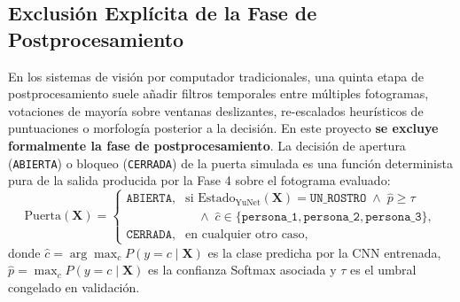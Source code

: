 \documentclass{article}
\begin{document}
\subsection{Exclusión Explícita de la Fase de Postprocesamiento}
En los sistemas de visión por computador tradicionales, una quinta etapa de postprocesamiento suele añadir filtros temporales entre múltiples fotogramas, votaciones de mayoría sobre ventanas deslizantes, re-escalados heurísticos de puntuaciones o morfología posterior a la decisión. En este proyecto \textbf{se excluye formalmente la fase de postprocesamiento}. La decisión de apertura (\texttt{ABIERTA}) o bloqueo (\texttt{CERRADA}) de la puerta simulada es una función determinista pura de la salida producida por la Fase 4 sobre el fotograma evaluado:
\begin{equation}
\text{Puerta}(\mathbf{X}) = \begin{cases}
\texttt{ABIERTA}, & \text{si } \text{Estado}_{\text{YuNet}}(\mathbf{X}) = \texttt{UN\_ROSTRO} \;\wedge\; \hat{p} \ge \tau \\
 & \quad \wedge\; \hat{c} \in \{\texttt{persona\_1}, \texttt{persona\_2}, \texttt{persona\_3}\}, \\
\texttt{CERRADA}, & \text{en cualquier otro caso},
\end{cases}
\label{eq:regla_acceso_determinista}
\end{equation}
donde $\hat{c} = \arg\max_{c} P(y = c \mid \mathbf{X})$ es la clase predicha por la CNN entrenada, $\hat{p} = \max_{c} P(y = c \mid \mathbf{X})$ es la confianza Softmax asociada y $\tau$ es el umbral congelado en validación.
\end{document}
